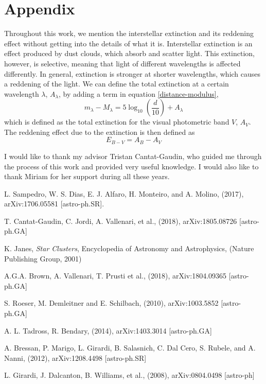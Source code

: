 \documentclass[twocolumn]{revtex4}
\begin{document}
\section{Appendix}
Throughout this work, we mention the interstellar extinction and its reddening effect without getting into the details of what it is. Interstellar extinction is an effect produced by dust clouds, which absorb and scatter light. This extinction, however, is selective, meaning that light of different wavelengths is affected differently. In general, extinction is stronger at shorter wavelengths, which causes a reddening of the light. We can define the total extinction at a certain wavelength $\lambda$, $A_\lambda$, by adding a term in equation \ref{distance-modulus},
\begin{equation}
m_\lambda - M_\lambda = 5 \log_{10} \left( \frac{d}{10} \right) + A_\lambda
\end{equation}
which is defined as the total extinction for the visual photometric band $V$, $A_V$. The reddening effect due to the extinction is then defined as
\begin{equation}
E_{B-V} = A_B - A_V
\end{equation}

\vspace*{0.5cm}
\begin{acknowledgments}
I would like to thank my advisor Tristan Cantat-Gaudin, who guided me through the process of this work and provided very useful knowledge. I would also like to thank Miriam for her support during all these years.
\end{acknowledgments}


\begin{thebibliography}{99}

 L. Sampedro, W. S. Dias, E. J. Alfaro, H. Monteiro, and A. Molino, (2017), arXiv:1706.05581 [astro-ph.SR].

 T. Cantat-Gaudin, C. Jordi, A. Vallenari, et al., (2018), arXiv:1805.08726 [astro-ph.GA]

 K. Janes, \textsl{Star Clusters}, Encyclopedia of Astronomy and Astrophysics, (Nature Publishing Group, 2001)

 A.G.A. Brown, A. Vallenari, T. Prusti et al., (2018), arXiv:1804.09365 [astro-ph.GA]

 S. Roeser, M. Demleitner and E. Schilbach, (2010), arXiv:1003.5852 [astro-ph.GA]

 A. L. Tadross, R. Bendary, (2014), arXiv:1403.3014 [astro-ph.GA]

 A. Bressan, P. Marigo, L. Girardi, B. Salasnich, C. Dal Cero, S. Rubele, and A. Nanni, (2012), arXiv:1208.4498 [astro-ph.SR]

 L. Girardi, J. Dalcanton, B. Williams, et al., (2008), arXiv:0804.0498 [astro-ph]


\end{thebibliography}
\end{document}
